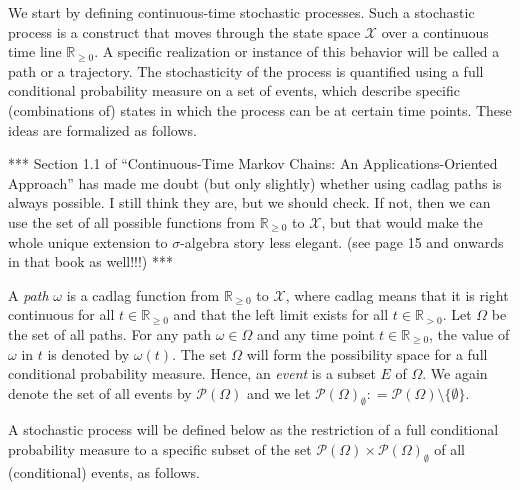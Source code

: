 \documentclass[10pt]{paper}
\theoremstyle{definition}
\newcommand{\reals}{\mathbb{R}}
\newcommand{\realspos}{\reals_{>0}}
\newcommand{\realsnonneg}{\reals_{\geq 0}}
\newcommand{\states}{\mathcal{X}}
\newcommand{\paths}{\Omega}
\newcommand{\power}{\mathcal{P}(\paths)}
\newcommand{\nonemptypower}{\power_{\emptyset}}
\newcommand{\coloneqq}{:\!=}
\begin{document}
We start by defining continuous-time stochastic processes. Such a stochastic process is a construct that moves through the state space $\states$ over a continuous time line $\realsnonneg$. A specific realization or instance of this behavior will be called a path or a trajectory. The stochasticity of the process is quantified using a full conditional probability measure on a set of events, which describe specific (combinations of) states in which the process can be at certain time points. These ideas are formalized as follows.

*** Section 1.1 of ``Continuous-Time Markov Chains: An Applications-Oriented Approach'' has made me doubt (but only slightly) whether using cadlag paths is always possible. I still think they are, but we should check. If not, then we can use the set of all possible functions from $\realsnonneg$ to $\states$, but that would make the whole unique extension to $\sigma$-algebra story less elegant. (see page 15 and onwards in that book as well!!!) ***

A \emph{path} $\omega$ is a cadlag function from $\realsnonneg$ to $\states$, where cadlag means that it is right continuous for all $t\in\realsnonneg$ and that the left limit exists for all $t\in\realspos$. Let $\paths$ be the set of all paths. For any path $\omega\in\paths$ and any time point $t\in\realsnonneg$, the value of $\omega$ in $t$ is denoted by $\omega(t)$. The set $\Omega$ will form the possibility space for a full conditional probability measure. Hence, an \emph{event} is a subset $E$ of $\paths$. We again denote the set of all events by $\power$ and we let $\nonemptypower\coloneqq\power\setminus\{\emptyset\}$. 

A stochastic process will be defined below as the restriction of a full conditional probability measure to a specific subset of the set $\power\times\nonemptypower$ of all (conditional) events, as follows.
\end{document}

